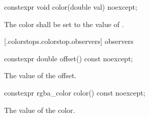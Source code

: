 \begin{itemdecl}
	constexpr void color(double val) noexcept;
\end{itemdecl}
\begin{itemdescr}
	\pnum
	\effects
	The color shall be set to the value of .
\end{itemdescr}

 [\iotwod.colorstops.colorstop.observers]{ observers}

\begin{itemdecl}
	constexpr double offset() const noexcept;
\end{itemdecl}
\begin{itemdescr}
	\pnum
	\returns
	The value of the offset.
\end{itemdescr}

\begin{itemdecl}
	constexpr rgba_color color() const noexcept;
\end{itemdecl}
\begin{itemdescr}
	\pnum
	\returns
	The value of the color.
\end{itemdescr}
